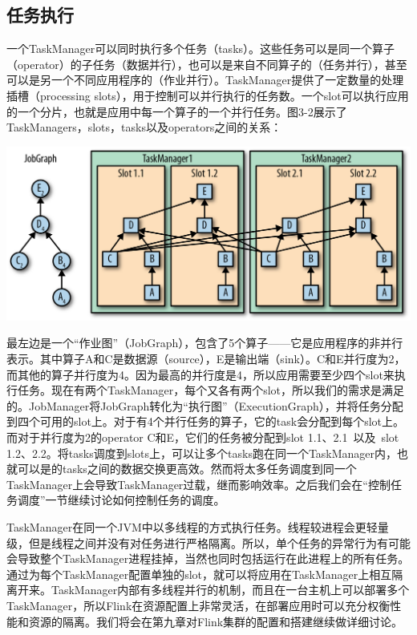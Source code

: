\documentclass[oneside]{ctexbook}
\begin{document}
\subsection{任务执行}

一个TaskManager可以同时执行多个任务（tasks）。这些任务可以是同一个算子（operator）的子任务（数据并行），也可以是来自不同算子的（任务并行），甚至可以是另一个不同应用程序的（作业并行）。TaskManager提供了一定数量的处理插槽（processing slots），用于控制可以并行执行的任务数。一个slot可以执行应用的一个分片，也就是应用中每一个算子的一个并行任务。图3-2展示了TaskManagers，slots，tasks以及operators之间的关系：

\noindent \includegraphics[width=\textwidth]{spaf_0302.png}

最左边是一个“作业图”（JobGraph），包含了5个算子——它是应用程序的非并行表示。其中算子A和C是数据源（source），E是输出端（sink）。C和E并行度为2，而其他的算子并行度为4。因为最高的并行度是4，所以应用需要至少四个slot来执行任务。现在有两个TaskManager，每个又各有两个slot，所以我们的需求是满足的。JobManager将JobGraph转化为“执行图”（ExecutionGraph），并将任务分配到四个可用的slot上。对于有4个并行任务的算子，它的task会分配到每个slot上。而对于并行度为2的operator C和E，它们的任务被分配到slot 1.1、2.1 以及 slot 1.2、2.2。将tasks调度到slots上，可以让多个tasks跑在同一个TaskManager内，也就可以是的tasks之间的数据交换更高效。然而将太多任务调度到同一个TaskManager上会导致TaskManager过载，继而影响效率。之后我们会在“控制任务调度”一节继续讨论如何控制任务的调度。

TaskManager在同一个JVM中以多线程的方式执行任务。线程较进程会更轻量级，但是线程之间并没有对任务进行严格隔离。所以，单个任务的异常行为有可能会导致整个TaskManager进程挂掉，当然也同时包括运行在此进程上的所有任务。通过为每个TaskManager配置单独的slot，就可以将应用在TaskManager上相互隔离开来。TaskManager内部有多线程并行的机制，而且在一台主机上可以部署多个TaskManager，所以Flink在资源配置上非常灵活，在部署应用时可以充分权衡性能和资源的隔离。我们将会在第九章对Flink集群的配置和搭建继续做详细讨论。
\end{document}
